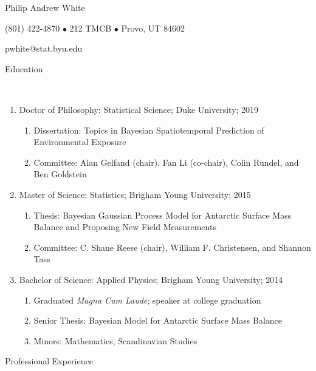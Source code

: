 \documentclass[11pt]{article}
\newcommand{\head}[1]{ %
    \bigskip %
    \begin{large}\begin{bf}{#1}\end{bf}\end{large} %

    \ \\ [-1.3cm] %

    \hrulefill}
\begin{document}

\centerline{ \LARGE Philip Andrew White }
\smallskip
\centerline{ (801) 422-4870 $\bullet$ 212 TMCB $\bullet$ Provo, UT 84602 }
\smallskip
\centerline{pwhite@stat.byu.edu }
\smallskip


\head{Education}

\begin{enumerate}[label=$\bullet$]
\item Doctor of Philosophy: Statistical Science; Duke University; 2019
\begin{enumerate}[label=$\cdot$]
\item Dissertation: Topics in Bayesian Spatiotemporal Prediction of Environmental Exposure
\item Committee: Alan Gelfand (chair), Fan Li (co-chair), Colin Rundel, and Ben Goldstein
\end{enumerate}

\item Master of Science: Statistics; Brigham Young University; 2015

\begin{enumerate}[label=$\cdot$]
\item Thesis: Bayesian Gaussian Process Model for Antarctic Surface Mass Balance and Proposing New Field Measurements
\item  Committee: C. Shane Reese (chair), William F. Christensen, and Shannon Tass
\end{enumerate}

\item Bachelor of Science: Applied Physics; Brigham Young University; 2014 

\begin{enumerate}[label=$\cdot$]
\item Graduated \emph{Magna Cum Laude}; speaker at college graduation
\item Senior Thesis: Bayesian Model for Antarctic Surface Mass Balance
\item Minors: Mathematics, Scandinavian Studies
\end{enumerate}
\end{enumerate}


\head{Professional Experience}
\end{document}
